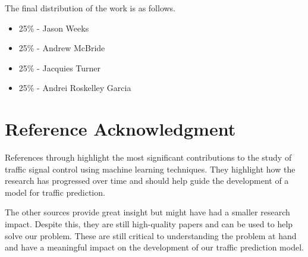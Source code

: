 \documentclass[conference]{IEEEtran}
\begin{document}
The final distribution of the work is as follows. 

\begin{itemize}
    \item 25\% - Jason Weeks
    \item 25\% - Andrew McBride
    \item 25\% - Jacquies Turner
    \item 25\% - Andrei Roskelley Garcia
\end{itemize}

\section*{Reference Acknowledgment}
References \cite{1} through \cite{15} highlight the most significant contributions to the study of traffic signal control using machine learning techniques. They highlight how the research has progressed over time and should help guide the development of a model for traffic prediction. 

The other sources provide great insight but might have had a smaller research impact. Despite this, they are still high-quality papers and can be used to help solve our problem. These are still critical to understanding the problem at hand and have a meaningful impact on the development of our traffic prediction model. 
\end{document}
